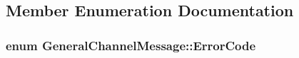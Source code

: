 \subsection{Member Enumeration Documentation}
\hypertarget{classGeneralChannelMessage_a4273153a78b91f1bbc1005c7fc83a42b}{
\subsubsection[{Error\-Code}]{\setlength{\rightskip}{0pt plus 5cm}enum {\bf General\-Channel\-Message\-::\-Error\-Code}\hspace{0.3cm}{\ttfamily [strong]}}}\label{classGeneralChannelMessage_a4273153a78b91f1bbc1005c7fc83a42b}
